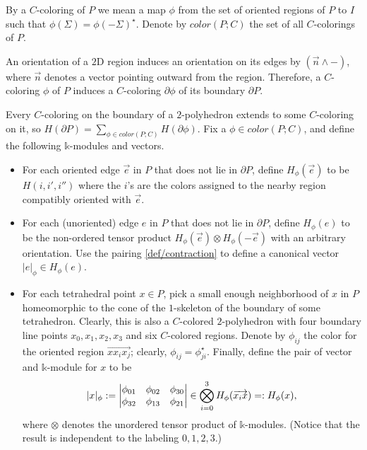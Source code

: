 By a $C$-coloring of $P$ we mean a map $\phi$ from the set of
oriented regions of $P$ to $I$ such that
$\phi(\Sigma) = \phi(-\Sigma)^{\star}$. Denote by $color(P; C)$
the set of all $C$-colorings of $P$.

An orientation of a $2$D region induces an orientation on its
edges by $(\vec{n} \wedge -)$, where $\vec{n}$ denotes a vector
pointing outward from the region. Therefore, a $C$-coloring
$\phi$ of $P$ induces a $C$-coloring $\partial \phi$ of its
boundary $\partial P$.

\begin{definition}\label{def/shadow-state-sum}
  Every $C$-coloring on the boundary of a $2$-polyhedron extends
  to some $C$-coloring on it, so
  $H(\partial P) = \sum_{\phi \in color(P; C)} H(\partial \phi)$.
  Fix a $\phi \in color(P; C)$, and define the following
  $\mathbb{k}$-modules and vectors.
\begin{itemize}
  \item For each oriented edge $\vec{e}$ in $P$ that does not lie
        in $\partial P$, define $H_{\phi}(\vec{e})$ to be
        $H(i,i',i'')$ where the $i$'s are the colors assigned to
        the nearby region compatibly oriented with $\vec{e}$.
  \item For each (unoriented) edge $e$ in $P$ that does not lie
        in $\partial P$, define $H_{\phi}(e)$ to be the
        non-ordered tensor product
        $H_{\phi}(\vec{e}) \otimes H_{\phi}(-\vec{e})$ with an
        arbitrary orientation. Use the pairing
        \ref{def/contraction} to define a canonical vector
        $|e|_{\phi} \in H_{\phi}(e)$.
  \item For each tetrahedral point $x \in P$, pick a small enough
        neighborhood of $x$ in $P$ homeomorphic to the cone of
        the $1$-skeleton of the boundary of some tetrahedron.
        Clearly, this is also a $C$-colored $2$-polyhedron with
        four boundary line points $x_{0}, x_{1}, x_{2}, x_{3}$
        and six $C$-colored regions. Denote by $\phi_{ij}$ the
        color for the oriented region
        $\overrightarrow{xx_{i}x_{j}}$; clearly,
        $\phi_{ij} = \phi_{ji}^{\star}$. Finally, define the pair
        of vector and $\mathbb{k}$-module for $x$ to
        be $$|x|_{\phi} := \begin{vmatrix} \phi_{01} & \phi_{02} & \phi_{30} \\ \phi_{32} & \phi_{13} & \phi_{21} \\ \end{vmatrix} \in \bigotimes_{i=0}^{3} H_{\phi}(\overrightarrow{x_{i}x}) =: H_{\phi}(x),$$
        where $\otimes$ denotes the unordered tensor product of
        $\mathbb{k}$-modules. (Notice that the result is
        independent to the labeling $0, 1, 2, 3$.)
\end{itemize}


\end{definition}
